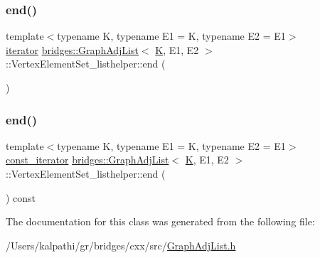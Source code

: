 \mbox{\label{classbridges_1_1_graph_adj_list_1_1_vertex_element_set__listhelper_aea97cdb87e88d3848e6451d1cfc62f2d}} 
\subsubsection{\texorpdfstring{end()}{end()}\hspace{0.1cm}{\footnotesize\ttfamily [1/2]}}
{\footnotesize\ttfamily template$<$typename K, typename E1 = K, typename E2 = E1$>$ \\
\mbox{\hyperlink{classbridges_1_1_graph_adj_list_1_1_vertex_element_set__listhelper_1_1iterator}{iterator}} \mbox{\hyperlink{classbridges_1_1_graph_adj_list}{bridges\+::\+Graph\+Adj\+List}}$<$ \mbox{\hyperlink{namespacebridges_acfb0a4f7877d8f63de3e6862004c50edaa5f3c6a11b03839d46af9fb43c97c188}{K}}, E1, E2 $>$\+::Vertex\+Element\+Set\+\_\+listhelper\+::end (\begin{DoxyParamCaption}{ }\end{DoxyParamCaption})\hspace{0.3cm}{\ttfamily [inline]}}

\mbox{\label{classbridges_1_1_graph_adj_list_1_1_vertex_element_set__listhelper_a7aff73080f67bec16219fd17d7f8bfd7}} 
\subsubsection{\texorpdfstring{end()}{end()}\hspace{0.1cm}{\footnotesize\ttfamily [2/2]}}
{\footnotesize\ttfamily template$<$typename K, typename E1 = K, typename E2 = E1$>$ \\
\mbox{\hyperlink{classbridges_1_1_graph_adj_list_1_1_vertex_element_set__listhelper_1_1const__iterator}{const\+\_\+iterator}} \mbox{\hyperlink{classbridges_1_1_graph_adj_list}{bridges\+::\+Graph\+Adj\+List}}$<$ \mbox{\hyperlink{namespacebridges_acfb0a4f7877d8f63de3e6862004c50edaa5f3c6a11b03839d46af9fb43c97c188}{K}}, E1, E2 $>$\+::Vertex\+Element\+Set\+\_\+listhelper\+::end (\begin{DoxyParamCaption}{ }\end{DoxyParamCaption}) const\hspace{0.3cm}{\ttfamily [inline]}}



The documentation for this class was generated from the following file\+:\begin{DoxyCompactItemize}
\item 
/\+Users/kalpathi/gr/bridges/cxx/src/\mbox{\hyperlink{_graph_adj_list_8h}{Graph\+Adj\+List.\+h}}\end{DoxyCompactItemize}
